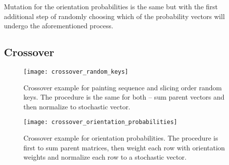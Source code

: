 Mutation for the orientation probabilities is the same but with the first additional
step of randomly choosing which of the probability vectors will undergo the aforementioned process.

\subsection{Crossover}\label{subsec:crossover}

\begin{figure}[htp]
    \texttt{[image: crossover\_random\_keys]}\caption{
        Crossover example for painting sequence and slicing order random keys.
        The procedure is the same for both – sum parent vectors and then normalize to stochastic vector.
    }
    \label{fig:crossover-random-keys}
\end{figure}

\begin{figure}[htp]
    \texttt{[image: crossover\_orientation\_probabilities]}\caption{
        Crossover example for orientation probabilities. The procedure is first to sum parent matrices,
        then weight each row with orientation weights and normalize each row to a stochastic vector.}
    \label{fit:crossover-orientation-probabilities}
\end{figure}


